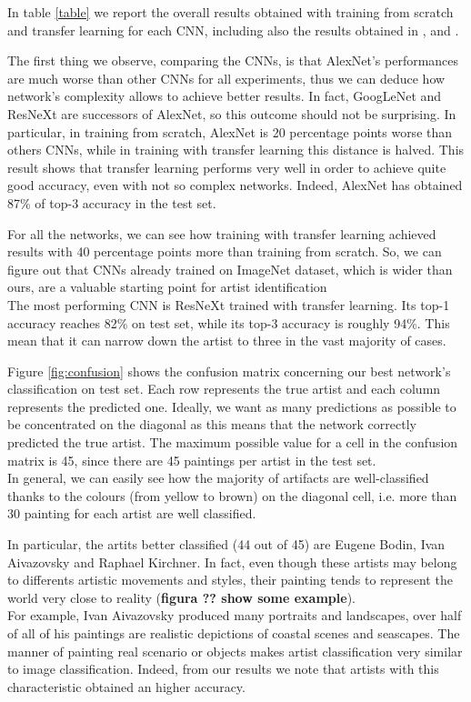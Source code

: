 \documentclass{article}
\begin{document}
In table \ref{table} we report the overall results obtained with training  from scratch and transfer learning for each CNN, including also the results obtained in \cite{ArtistIdCNN406}, \cite{Saleh2015} and \cite{mensink2014}.

The first thing we observe, comparing the CNNs, is that AlexNet's performances are much worse than other CNNs for all experiments, thus we can deduce how network's complexity allows to achieve better results. In fact, GoogLeNet and ResNeXt are successors of AlexNet, so this outcome should not be surprising. 
In particular, in training from scratch, AlexNet is 20 percentage points worse than others CNNs, while in training with transfer learning this distance is halved. This result shows that transfer learning performs very well in order to achieve quite good accuracy, even with not so complex networks. Indeed, AlexNet has obtained 87\% of top-3 accuracy in the test set.

For all the networks, we can see how training with transfer learning achieved results with 40 percentage points more than training from scratch. So, we can figure out that CNNs already trained on ImageNet dataset, which is wider than ours,  are a valuable starting point for artist identification\\
The most performing CNN is ResNeXt trained with transfer learning. Its top-1 accuracy reaches 82\% on test set, while its top-3 accuracy is roughly 94\%. This mean that it can narrow down the artist to three in the vast majority of cases.

Figure \ref{fig:confusion} shows the confusion matrix concerning our best network's classification on test set. Each row represents the true artist and each column represents the predicted one. Ideally, we want as many predictions as possible to be concentrated on the diagonal as this means that the network correctly predicted the true artist. The maximum possible value for a cell in the confusion matrix is 45, since there are 45 paintings per artist in the test set.\\
In general, we can easily see how the majority of artifacts are well-classified thanks to the colours (from yellow to brown) on the diagonal cell, i.e. more than 30 painting for each artist are well classified.

In particular, the artits better classified (44 out of 45) are Eugene Bodin, Ivan Aivazovsky and Raphael Kirchner. In fact, even though these artists may belong to differents artistic movements and styles, their painting tends to represent the world very close to reality (\textbf{figura ?? show some example}).\\
For example, Ivan Aivazovsky produced many portraits and landscapes, over half of all of his paintings are realistic depictions of coastal scenes and seascapes. The manner of painting real scenario or objects makes artist classification very similar to image classification. Indeed, from our results we note that artists with this characteristic obtained an higher accuracy.
\end{document}
